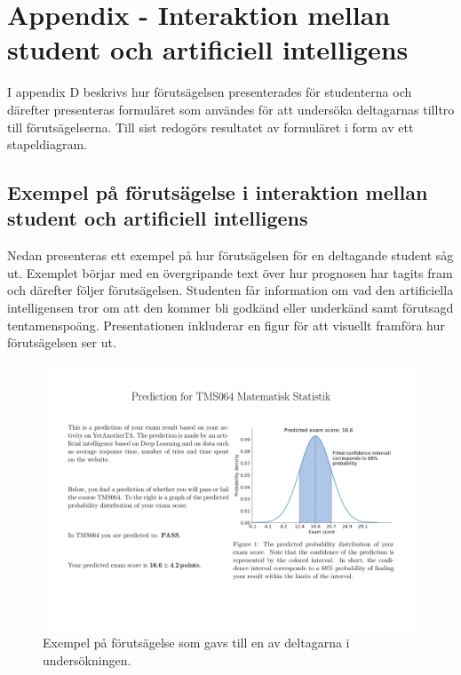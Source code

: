 


\chapter{Appendix - Interaktion mellan student och artificiell intelligens}


I appendix D beskrivs hur förutsägelsen presenterades för studenterna och därefter presenteras formuläret som användes för att undersöka deltagarnas tilltro till förutsägelserna. Till sist redogörs resultatet av formuläret i form av ett stapeldiagram.


\section{Exempel på förutsägelse i interaktion mellan student och artificiell intelligens}
\label{app:AI-test-figur}
Nedan presenteras ett exempel på hur förutsägelsen för en deltagande student såg ut. Exemplet börjar med en övergripande text över hur prognosen har tagits fram och därefter följer förutsägelsen. Studenten får information om vad den artificiella intelligensen tror om att den kommer bli godkänd eller underkänd samt förutsagd tentamenspoäng. Presentationen inkluderar en figur för att visuellt framföra hur förutsägelsen ser ut. 
\begin{figure}[hbtp]
    \centering
    \includegraphics[page=1,scale=0.22]{appendix/AI-test-rapport.png}
    \caption{Exempel på förutsägelse som gavs till en av deltagarna i undersökningen.}
    \label{fig:AI-bild}
\end{figure}

\newpage

